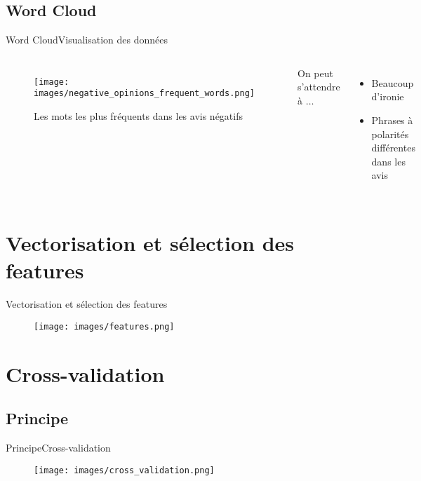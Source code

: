 \documentclass[usenames,dvipsnames]{beamer}
\begin{document}
\subsection{Word Cloud}
\begin{frame}{Word Cloud}{Visualisation des données}
\begin{columns}
\begin{figure}[!ht]
    \centering
    \texttt{[image: images/negative\_opinions\_frequent\_words.png]}
    \caption{Les mots les plus fréquents dans les avis négatifs}
\end{figure}
On peut s'attendre à $\dots$
\begin{itemize}
    \item Beaucoup d'ironie
    \item Phrases à polarités différentes dans les avis
\end{itemize}
\end{columns}
\end{frame}

\section{Vectorisation et sélection des features}
\begin{frame}{Vectorisation et sélection des features}
\begin{figure}[!ht]
    \centering
    \texttt{[image: images/features.png]}
\end{figure}
\end{frame}

\section{Cross-validation}
\subsection{Principe}
\begin{frame}{Principe}{Cross-validation}
\begin{figure}[!ht]
  \centering
  \texttt{[image: images/cross\_validation.png]}
\end{figure}
\end{frame}
\end{document}
